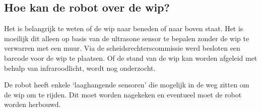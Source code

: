 \documentclass{peno}
\begin{document}

\subsection*{Hoe kan de robot over de wip?}
Het is belangrijk te weten of de wip naar beneden of naar boven staat. Het is moeilijk dit alleen op basis van de ultrasone sensor te bepalen zonder de wip te verwarren met een muur. Via de scheidsrechterscommissie werd besloten een barcode voor de wip te plaatsen. Of de stand van de wip kan worden afgeleid met behulp van infraroodlicht, wordt nog onderzocht.

De robot heeft enkele `laaghangende sensoren' die mogelijk in de weg zitten om de wip om te rijden. Dit moet worden nagekeken en eventueel moet de robot worden herbouwd.



\end{document}

